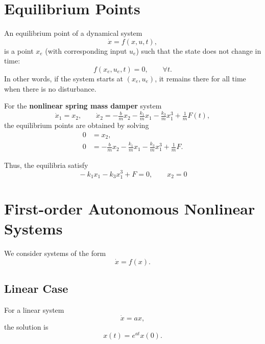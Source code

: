 \section{Equilibrium Points}

\begin{definition}
An equilibrium point of a dynamical system
\begin{equation}
    \dot{x} = f(x,u,t),
\end{equation}
is a point $x_e$ (with corresponding input $u_e$) such that the state does not change in time:
\begin{equation}
    f(x_e,u_e,t) = 0, \qquad \forall t.
\end{equation}
In other words, if the system starts at $(x_e,u_e)$, it remains there for all time when there is no disturbance.
\end{definition}

\begin{example}
For the \textbf{nonlinear spring mass damper} system
\begin{equation}
    \dot{x}_1 = x_2, \qquad 
    \dot{x}_2 = -\tfrac{b}{m}x_2 - \tfrac{k_1}{m}x_1 - \tfrac{k_3}{m}x_1^3 + \tfrac{1}{m}F(t),
\end{equation}
the equilibrium points are obtained by solving
\begin{align}
    0 &= x_2, \\
    0 &= -\tfrac{b}{m}x_2 - \tfrac{k_1}{m}x_1 - \tfrac{k_3}{m}x_1^3 + \tfrac{1}{m}F.
\end{align}

Thus, the equilibria satisfy
\begin{equation}
\boxed{\, -k_1 x_1 - k_3 x_1^3 + F = 0, \qquad x_2 = 0 \,}
\end{equation}
\end{example}


\section{First-order Autonomous Nonlinear Systems}

We consider systems of the form
\begin{equation}
    \dot{x} = f(x).
\end{equation}

\subsection{Linear Case}
For a linear system
\begin{equation}
    \dot{x} = a x,
\end{equation}
the solution is
\begin{equation}
    x(t) = e^{at} x(0).
\end{equation}

